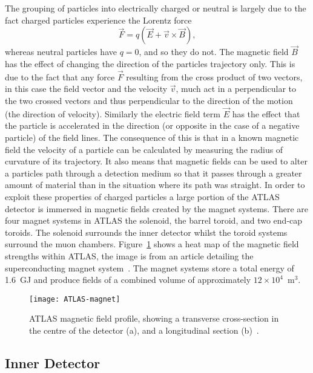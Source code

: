 The grouping of particles into electrically charged or neutral is largely due to
the fact charged particles experience the Lorentz force
\begin{equation}
  \label{eq:lorentz}
  \vec{F} = q(\vec{E} + \vec{v} \times \vec{B}),
\end{equation}
whereas neutral particles have $q=0$, and so they do not. The magnetic field
$\vec{B}$ has the effect of changing the direction of the particles trajectory
only. This is due to the fact that any force $\vec{F}$ resulting from the cross
product of two vectors, in this case the field vector and the velocity $\vec{v}$,
much act in a perpendicular to the two crossed vectors and thus perpendicular to
the direction of the motion (the direction of velocity). Similarly the electric
field term $\vec{E}$ has the effect that the particle is accelerated in the
direction (or opposite in the case of a negative particle) of the field lines.
The consequence of this is that in a known magnetic field the velocity of a
particle can be calculated by measuring the radius of curvature of its
trajectory. It also means that magnetic fields can be used to alter a particles
path through a detection medium so that it passes through a greater amount of
material than in the situation where its path was straight. In order to exploit
these properties of charged particles a large portion of the ATLAS detector is
immersed in magnetic fields created by the magnet systems. There are four magnet
systems in ATLAS the solenoid, the barrel toroid, and two end-cap toroids. The
solenoid surrounds the inner detector whilst the toroid systems surround the
muon chambers. Figure~\ref{fig:ATLAS-magnets} shows a heat map of the magnetic
field strengths within ATLAS, the image is from an article detailing the
superconducting magnet system~\cite{ATLAS-magnets}. The magnet systems store a
total energy of 1.6~GJ and produce fields of a combined volume of approximately
$12\times 10^4$~m$^3$.
\begin{figure}[h]
  \centering
  \texttt{[image: ATLAS-magnet]}
  \caption[ATLAS magnetic field]{ATLAS magnetic field profile, showing a
    transverse cross-section in the centre of the detector (a), and a
    longitudinal section (b)~\cite{ATLAS-magnets}.}%
  \label{fig:ATLAS-magnets}
\end{figure}

\subsection{Inner Detector}%
\label{sec:id}

